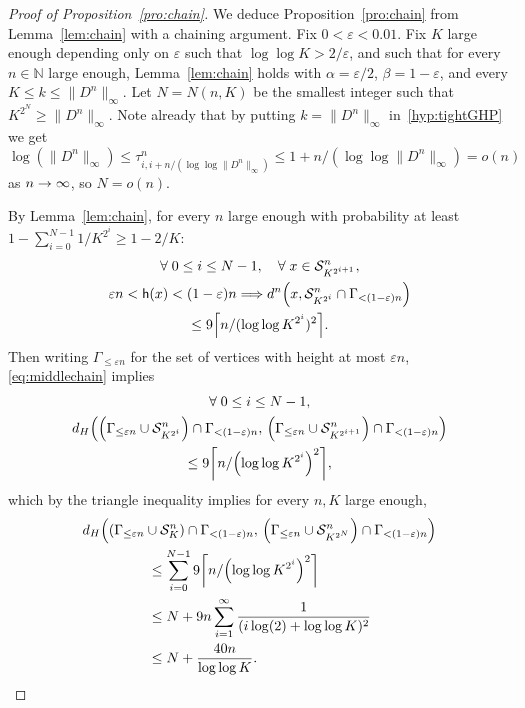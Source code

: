 \documentclass[AHL,Unicode,published]{cedram}
\newcommand{\e}{\varepsilon}
\newcommand{\N}{\mathbb{N}}
\newcommand{\1}{\mathbbm{1}}
\newcommand{\trail}{\mathcal{S}}
\newcommand{\h}{\mathsf{h}}
\let\originalleft\left
\let\originalright\right
\renewcommand{\left}{\mathopen{}\mathclose\bgroup\originalleft}
\renewcommand{\right}{\aftergroup\egroup\originalright}
\renewcommand*{\to}{\mathchoice{\longrightarrow}{\rightarrow}{\rightarrow}{\rightarrow}}
\renewcommand*{\implies}{\mathchoice{\Longrightarrow}{\Rightarrow}{\Rightarrow}{\Rightarrow}}
\let\oldforall\forall
\renewcommand*{\forall}{\mathrel{\oldforall}}
\begin{document}
\begin{proof}[Proof of Proposition~\ref{pro:chain}]
We deduce Proposition~\ref{pro:chain} from Lemma~\ref{lem:chain} with a chaining argument. Fix $0<\e<0.01$. Fix $K$ large enough depending only on $\e$ such that $\log \log K>2/\e$, and such that for every $n\in \N$ large enough, Lemma~\ref{lem:chain} holds with $\alpha=\e/2$, $\beta=1-\e$, and every $K\leq k \leq \|D^n\|_\infty$. Let $N=N(n,K)$ be the smallest integer such that $K^{2^N}\geq \|D^n\|_\infty$. { Note already that by putting $k=\|D^n\|_\infty$ in~\ref{hyp:tightGHP} we get
\[
\log(\|D^n\|_\infty) \leq \tau^n_{i,i+n/(\log \log \|D^n\|_\infty)} \leq 1+n/(\log \log\|D^n\|_\infty)=o(n)
\]
as $n \to \infty$, so $N=o(n)$.}

By Lemma~\ref{lem:chain}, for every $n$ large enough with probability at least $1-\sum_{i=0}^{N-1} 1/K^{2^i}\geq 1-2/K$:
\begin{multline}\label{eq:middlechain}
\forall 0\leq i \leq N-1, \quad \forall x\in \trail_{K^{2^{i+1}}}^n,\\
\e n< \h(x)<(1-\e) n \implies d^n\left(x,\trail_{K^{2^i}}^n \cap \Gamma_{<(1-\e) n}\right)\\
\le 9 \left\lceil n/(\log \log K^{2^i})^2 \right\rceil. 
\end{multline}
Then writing $\Gamma_{\leq \e n}$ for the set of vertices with height at most $\e n$, \eqref{eq:middlechain} implies
\begin{multline*}
\forall 0\leq i \leq N-1,\\ d_H\left(\left(\Gamma_{\leq \e n}\cup \trail_{K^{2^i}}^n\right)\cap \Gamma_{<(1-\e) n},\,  \left(\Gamma_{\leq \e n}\cup \trail_{K^{2^{i+1}}}^n\right)\cap \Gamma_{<(1-\e) n} \right)\\
\leq 9 \left\lceil n/\left(\log \log K^{2^i}\right)^2 \right\rceil,
\end{multline*}
which by the triangle inequality implies for every $n,K$ large enough,
\begin{multline*}
d_H \left(\left(\Gamma_{\leq \e n}\cup \trail_K^n\right)\cap \Gamma_{<(1-\e) n}, \, \left(\Gamma_{\leq \e n}\cup \trail_{K^{2^N}}^n\right)\cap \Gamma_{<(1-\e) n} \right)\\
\begin{aligned}
&\leq \sum_{i=0}^{N-1} 9 \left\lceil n/\left(\log \log K^{2^i}\right)^2 \right\rceil \\
&\leq N+9n \sum_{i=1}^\infty \frac{1}{(i\log(2)+\log \log K)^2}\\
&\le N+\frac{40 n}{\log \log K}.
\end{aligned}

\end{multline*}
\end{proof}
\end{document}
